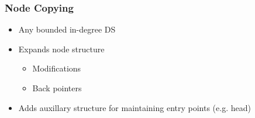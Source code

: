 \documentclass{beamer}
\begin{document}
\begin{frame}
\frametitle{Node Copying}
\begin{itemize}
  \item Any bounded in-degree DS \cite{Driscoll198986}
  \item Expands node structure
  \begin{itemize}
    \item Modifications
    \item Back pointers
  \end{itemize}
  \item Adds auxillary structure for maintaining entry points (e.g. head)
\end{itemize}
\pause
\begin{figure}
\center
{}

\end{figure}
\end{frame}
\end{document}
